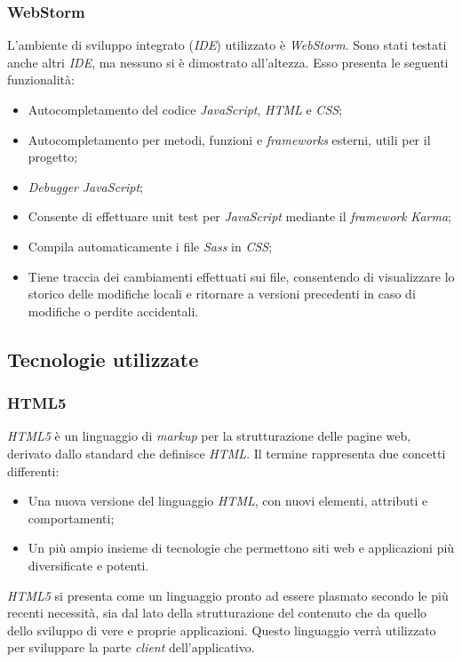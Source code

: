 \subsubsection{WebStorm}
L'ambiente di sviluppo integrato (\textit{IDE}) utilizzato è \textit{WebStorm}. Sono stati testati anche altri \textit{IDE}, ma nessuno si è dimostrato all'altezza. Esso presenta le seguenti funzionalità:
\begin{itemize}
\item
Autocompletamento del codice \textit{JavaScript}, \textit{HTML} e \textit{CSS};
\item
Autocompletamento per metodi, funzioni e \textit{frameworks} esterni, utili per il progetto;
\item
\textit{Debugger} \textit{JavaScript};
\item
Consente di effettuare unit test per \textit{JavaScript} mediante il \textit{framework} \textit{Karma};
\item
Compila automaticamente i file \textit{Sass} in \textit{CSS};
\item
Tiene traccia dei cambiamenti effettuati sui file, consentendo di visualizzare lo storico delle modifiche locali e ritornare a versioni precedenti in caso di modifiche o perdite accidentali.
\end{itemize}


\subsection{Tecnologie utilizzate}
\subsubsection{HTML5}
\textit{HTML5} è un linguaggio di \textit{markup} per la strutturazione delle pagine web, derivato dallo standard che definisce \textit{HTML}.
Il termine rappresenta due concetti differenti:
\begin{itemize}
		\item
			Una nuova versione del linguaggio \textit{HTML}, con nuovi elementi, attributi e comportamenti;
		\item
			Un più ampio insieme di tecnologie che permettono siti web e applicazioni più diversificate e potenti.
\end{itemize}
\textit{HTML5} si presenta come un linguaggio pronto ad essere plasmato secondo le più recenti necessità, sia dal lato della strutturazione del contenuto che da quello dello sviluppo di vere e proprie applicazioni.
Questo linguaggio verrà utilizzato per sviluppare la parte \textit{client} dell'applicativo.

